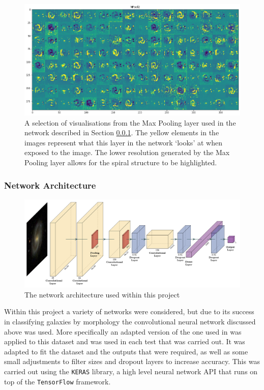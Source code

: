 \documentclass[12pt, onecolumn]{aa}
\begin{document}
\begin{figure}[h]
    \centering
    \includegraphics[width=0.9\linewidth, trim={3.3cm 4.5cm 4.1cm 4.5cm}, clip]{Figures/activation_layers/Mpool_2.png}
    \caption{A selection of visualisations from the Max Pooling layer used in the network described in Section \ref{sec:deeparchit}. The yellow elements in the images represent what this layer in the network ‘looks’ at when exposed to the image. The lower resolution generated by the Max Pooling layer allows for the spiral structure to be highlighted.}
    \label{fig:poolingexample2}
\end{figure}
\subsubsection{Network Architecture}\label{sec:deeparchit}
\begin{figure}
    \centering
    \includegraphics[width=1.\linewidth]{Figures/net_arc.png}
    \caption{The network architecture used within this project}
    \label{fig:netarch}
\end{figure}
Within this project a variety of networks were considered, but due to its success in classifying galaxies by morphology \citep{DielemanS2015,2015ApJS..221....8H,2018arXiv180710406D} the convolutional neural network discussed above was used. More specifically an adapted version of the one used in \cite{sancheztransfer} was applied to this dataset and was used in each test that was carried out. It was adapted to fit the dataset and the outputs that were required, as well as some small adjustments to filter sizes and dropout layers to increase accuracy. This was carried out using the \verb|KERAS| \citep{chollet2015keras} library, a high level neural network API that runs on top of the \verb|TensorFlow| framework.\\
\end{document}
